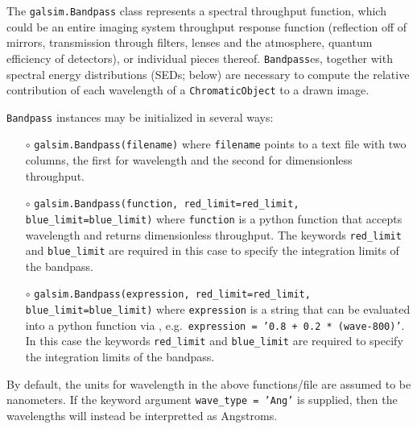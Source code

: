 \documentclass[preprint,11pt]{../../devel/modules/aastex}
\begin{document}
The \texttt{galsim.Bandpass} class represents a spectral throughput function, which could be an
entire imaging system throughput response function (reflection off of mirrors, transmission through
filters, lenses and the atmosphere, quantum efficiency of detectors), or individual pieces thereof.
\texttt{Bandpass}es, together with spectral energy distributions (SEDs; below) are necessary to
compute the relative contribution of each wavelength of a \texttt{ChromaticObject} to a drawn image.

\texttt{Bandpass} instances may be initialized in several ways:
\begin{itemize}
\item[$\circ$] {\tt galsim.Bandpass(filename)} \newline where \texttt{filename} points to a
  text file with two columns, the first for wavelength and the second for dimensionless throughput.
\item[$\circ$] {\tt galsim.Bandpass(function, red\_limit=red\_limit, blue\_limit=blue\_limit)}
  \newline where \texttt{function} is a python function that accepts wavelength and returns
  dimensionless throughput.  The keywords \texttt{red\_limit} and \texttt{blue\_limit} are required in this case
  to specify the integration limits of the bandpass.
\item[$\circ$] {\tt galsim.Bandpass(expression, red\_limit=red\_limit, blue\_limit=blue\_limit)}
  \newline where \texttt{expression} is a string that can be evaluated into a python function via
  ,
  \newline e.g.\ {\tt expression = '0.8 + 0.2 * (wave-800)'}. In this
  case the keywords \texttt{red\_limit} and
  \texttt{blue\_limit} are required to specify the integration limits of the bandpass.
\end{itemize}

By default, the units for wavelength in the above functions/file are assumed to be nanometers.  If
the keyword argument \texttt{wave\_type = 'Ang'} is supplied, then the wavelengths will instead be
interpretted as Angstroms.
\end{document}

